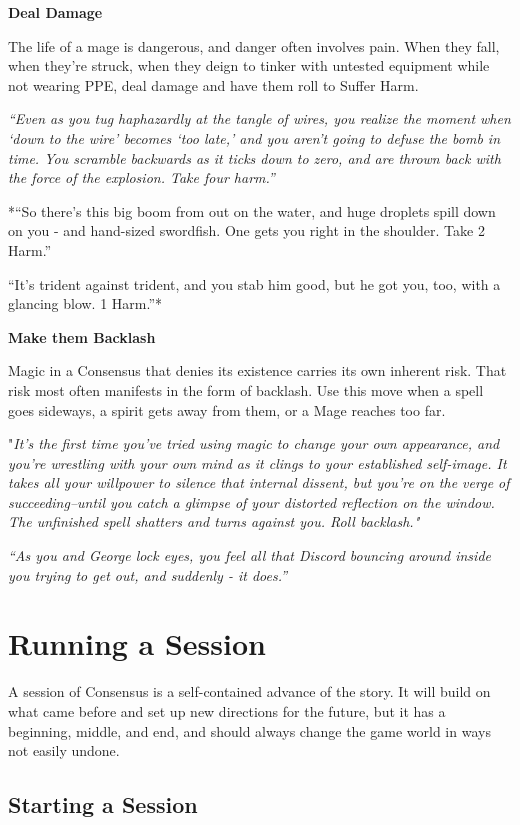 \documentclass[
  oneside,
  statementpaper,
  9pt]{memoir}
\begin{document}
\textbf{Deal Damage}

The life of a mage is dangerous, and danger often involves pain. When
they fall, when they're struck, when they deign to tinker with untested
equipment while not wearing PPE, deal damage and have them roll to
Suffer Harm.

\emph{``Even as you tug haphazardly at the tangle of wires, you realize
the moment when `down to the wire' becomes `too late,' and you aren't
going to defuse the bomb in time. You scramble backwards as it ticks
down to zero, and are thrown back with the force of the explosion. Take
four harm.''}

*``So there's this big boom from out on the water, and huge droplets
spill down on you - and hand-sized swordfish. One gets you right in the
shoulder. Take 2 Harm.''

``It's trident against trident, and you stab him good, but he got you,
too, with a glancing blow. 1 Harm.''*

\textbf{Make them Backlash}

Magic in a Consensus that denies its existence carries its own inherent
risk. That risk most often manifests in the form of backlash. Use this
move when a spell goes sideways, a spirit gets away from them, or a Mage
reaches too far.

"\emph{It's the first time you've tried using magic to change your own
appearance, and you're wrestling with your own mind as it clings to your
established self-image. It takes all your willpower to silence that
internal dissent, but you're on the verge of succeeding--until you catch
a glimpse of your distorted reflection on the window. The unfinished
spell shatters and turns against you. Roll backlash."}

\emph{``As you and George lock eyes, you feel all that Discord bouncing
around inside you trying to get out, and suddenly - it does.''}

\hypertarget{running-a-session}{%
\section{Running a Session}\label{running-a-session}}

A session of Consensus is a self-contained advance of the story. It will
build on what came before and set up new directions for the future, but
it has a beginning, middle, and end, and should always change the game
world in ways not easily undone.

\hypertarget{starting-a-session}{%
\subsection{Starting a Session}\label{starting-a-session}}
\end{document}
